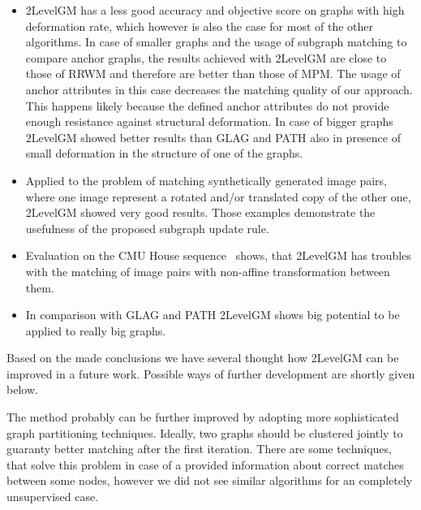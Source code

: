 \begin{itemize}
\item 2LevelGM has a less good accuracy and objective score on graphs with high deformation rate, which however is also the case for most of the other algorithms. In case of smaller graphs and the usage of subgraph matching to compare anchor graphs, the results achieved with 2LevelGM are close to those of RRWM and therefore are better than those of MPM. The usage of anchor attributes in this case decreases the matching quality of our approach.  This happens likely because the defined anchor attributes do not provide enough resistance against structural deformation. In case of bigger graphs 2LevelGM showed better results than GLAG and PATH also in presence of small deformation in the structure of one of the graphs.
\item Applied to the problem of matching synthetically generated image pairs, where one image represent a rotated and/or translated copy of the other one, 2LevelGM showed very good results.
Those examples demonstrate the usefulness of the proposed subgraph update rule.
\item Evaluation on the CMU House sequence~\cite{CMUHouse} shows, that 2LevelGM has troubles with the matching of image pairs with non-affine transformation between them.
\item In comparison with GLAG and PATH 2LevelGM shows big potential to be applied to really big graphs.
\end{itemize}


Based on the made conclusions we have several thought how 2LevelGM can be improved in a future work. %
Possible ways of further development are shortly given below.
 
The method probably can be further improved by adopting more sophisticated graph partitioning techniques. Ideally, two graphs should be clustered jointly to guaranty better matching after the first iteration. There are some techniques, that solve this problem in case of a provided information about correct matches between some nodes, however we did not see similar algorithms for an completely unsupervised case.

